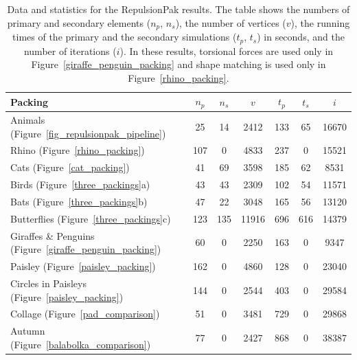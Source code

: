 \begin{table}[h]
\centering 
\caption[Data and statistics for the RepulsionPak results]
{
   Data and statistics for the RepulsionPak results.  The table shows the
   numbers of primary and secondary elements ($n_p$, $n_s$),
   the number of vertices ($v$), 
   the running times of the primary and the secondary simulations ($t_p$, $t_s$) in seconds,
   and the number of iterations ($i$).
   In these results, torsional forces are used only in 
   Figure~\ref{giraffe_penguin_packing} and shape matching is used only 
   in Figure~\ref{rhino_packing}.
   }
\label{packing_statistics}
\begin{tabular}{|l|c|c|c|c|c|c|}
\hline
\cellcolor{lg}Packing                  & \cellcolor{lg}$n_p$ & \cellcolor{lg}$n_s$ & \cellcolor{lg}$v$   & \cellcolor{lg}$t_p$ & \cellcolor{lg}$t_s$ & \cellcolor{lg}$i$\\ \hline
Animals (Figure~\ref{fig_repulsionpak_pipeline})                       & 25    & 14   & 2412  & 133  & 65  & 16670\\ \hline
Rhino   (Figure~\ref{rhino_packing})        & 107   & 0    & 4833  & 237  & 0   & 15521\\ \hline
Cats (Figure~\ref{cat_packing})                       & 41    & 69   & 3598  & 185  & 62  & 8531\\ \hline
Birds  (Figure~\ref{three_packings}a)                 & 43    & 43   & 2309  & 102  & 54  & 11571\\ \hline
Bats (Figure~\ref{three_packings}b)                   & 47    & 22   & 3048  & 165  & 56  & 13120\\ \hline
Butterflies (Figure~\ref{three_packings}c)            & 123   & 135  & 11916 & 696  & 616 & 14379\\ \hline
Giraffes \& Penguins (Figure~\ref{giraffe_penguin_packing})        & 60    & 0   & 2250  & 163  & 0   & 9347\\ \hline
Paisley (Figure~\ref{paisley_packing})      & 162   & 0    & 4860  & 128  & 0   & 23040\\ \hline
Circles in Paisleys (Figure~\ref{paisley_packing})      & 144   & 0    & 2544  & 403  & 0   & 29584\\ \hline
Collage (Figure~\ref{pad_comparison})       & 51    & 0    & 3481  & 729  & 0   & 29868\\ \hline
Autumn  (Figure~\ref{balabolka_comparison}) & 77    & 0    & 2427  & 868  & 0   & 38387\\ \hline
\end{tabular}
\end{table}


